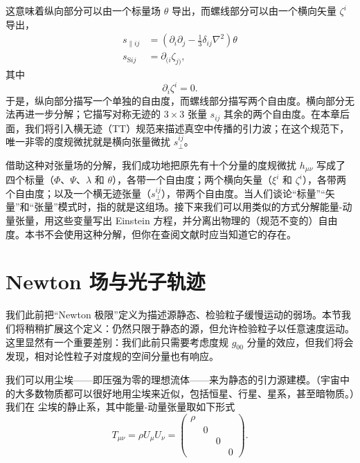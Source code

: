 这意味着纵向部分可以由一个标量场 $\theta$ 导出，而螺线部分可以由一个横向矢量 $\zeta^{i}$ 导出，
\begin{align*}
s_{\parallel ij} &= \left(\partial_{i}\partial_{j} - \frac{1}{3}\delta_{ij}\nabla^{2}\right)\theta \\
s_{\mathrm{S}ij} &= \partial_{(i}\zeta_{j)},
\tag{7.52}
\end{align*}
其中
\begin{equation*}
\partial_{i}\zeta^{i} = 0.
\tag{7.53}
\end{equation*}
于是，纵向部分描写一个单独的自由度，而螺线部分描写两个自由度。横向部分无法再进一步分解；它描写对称无迹的 $3 \times 3$ 张量 $s_{ij}$ 其余的两个自由度。在本章后面，我们将引入横无迹（TT）规范来描述真空中传播的引力波；在这个规范下，唯一非零的度规微扰就是横向张量微扰 $s_{\perp}^{ij}$。

借助这种对张量场的分解，我们成功地把原先有十个分量的度规微扰 $h_{\mu\nu}$ 写成了四个标量（$\Phi$、$\Psi$、$\lambda$ 和 $\theta$），各带一个自由度；两个横向矢量（$\xi^{i}$ 和 $\zeta^{i}$），各带两个自由度；以及一个横无迹张量（$s_{\perp}^{ij}$），带两个自由度。当人们谈论“标量”“矢量”和“张量”模式时，指的就是这组场。接下来我们可以用类似的方式分解能量-动量张量，用这些变量写出 Einstein 方程，并分离出物理的（规范不变的）自由度。本书不会使用这种分解，但你在查阅文献时应当知道它的存在。

\section{Newton 场与光子轨迹}

我们此前把“Newton 极限”定义为描述源静态、检验粒子缓慢运动的弱场。本节我们将稍稍扩展这个定义：仍然只限于静态的源，但允许检验粒子以任意速度运动。这里显然有一个重要差别：我们此前只需要考虑度规 $g_{00}$ 分量的效应，但我们将会发现，相对论性粒子对度规的空间分量也有响应。

我们可以用尘埃——即压强为零的理想流体——来为静态的引力源建模。（宇宙中的大多数物质都可以很好地用尘埃来近似，包括恒星、行星、星系，甚至暗物质。）我们在
尘埃的静止系，其中能量-动量张量取如下形式
\begin{equation*}
T_{\mu\nu} = \rho U_\mu U_\nu =
\begin{pmatrix}
\rho & & & \\
& 0 & & \\
& & 0 & \\
& & & 0
\end{pmatrix}.
\tag{7.54}
\end{equation*}

